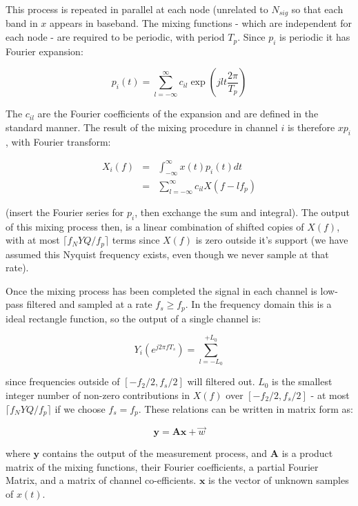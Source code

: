 \documentclass[titlepage]{article}
\begin{document}
This process is repeated in parallel at each node (unrelated to \(N_{sig}\) so that each band in \(x\) appears in baseband. The mixing functions - which are independent for each node - are required to be periodic, with period \(T_p\). Since \(p_i\) is periodic it has Fourier expansion:

\begin{equation}
p_i\left(t\right) = \sum_{l=-\infty}^{\infty} c_{il} \exp\left({jlt\frac{2\pi}{T_p}}\right)
\end{equation}

The \(c_{il}\) are the Fourier coefficients of the expansion and are defined in the standard manner. The result of the mixing procedure in channel \(i\) is therefore \(xp_i\), with Fourier transform:

\begin{align}
X_{i}\left(f\right) &=& \int_{-\infty}^{\infty} x\left(t\right) p_i\left(t\right) dt
\\ &=& \sum_{l=-\infty}^{\infty} c_{il} X\left(f-lf_p\right)
\end{align}

(insert the Fourier series for \(p_i\), then exchange the sum and integral). The output of this mixing process then, is a linear combination of shifted copies of \(X\left(f\right)\), with at most \(\lceil f_NYQ/f_p\rceil\) terms since \(X\left(f\right)\) is zero outside it's support (we have assumed this Nyquist frequency exists, even though we never sample at that rate).

Once the mixing process has been completed the signal in each channel is low-pass filtered and sampled at a rate \(f_s \geq f_p\). In the frequency domain this is a ideal rectangle function, so the output of a single channel is:

\begin{equation}
Y_i\left(e^{j 2 \pi f T_s }\right) = \sum_{l = -L_0}^{+L_0}
\end{equation}

since frequencies outside of \([-f_2/2, f_s/2]\) will filtered out. \(L_0\) is the smallest integer number of non-zero contributions in \(X\left(f\right)\) over \([-f_2/2, f_s/2]\) - at most \(\lceil f_NYQ/f_p\rceil\) if we choose \(f_s = f_p\). These relations can be written in matrix form as:

\begin{equation}
\textbf{y} = \textbf{A}\textbf{x} + \vec{w}
\end{equation}

where \(\textbf{y}\) contains the output of the measurement process, and \(\textbf{A}\) is a product matrix of the mixing functions, their Fourier coefficients, a partial Fourier Matrix, and a matrix of channel co-efficients. \(\textbf{x}\) is the vector of unknown samples of \(x\left(t\right)\). 
\end{document}
